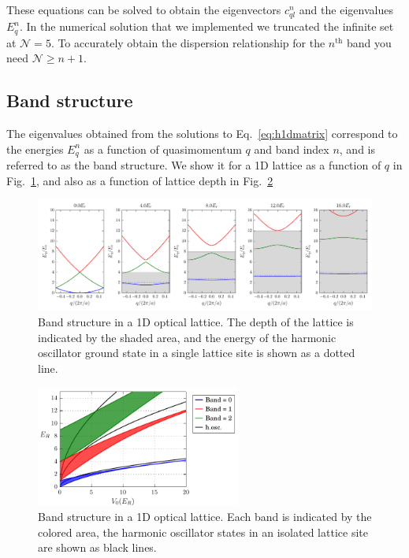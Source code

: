\documentclass[oneside,11pt]{memoir}
\begin{document}
These equations can be solved to obtain the eigenvectors $c_{ql}^{n}$ and the
eigenvalues $E_{q}^{n}$.  In the numerical solution that we implemented  we
truncated the infinite set at $\mathcal{N}=5$.  To accurately obtain the
dispersion relationship for the $n^{\text{th}}$ band you need $\mathcal{N}\geq
n+1$.  

\subsection{Band structure}

The eigenvalues  obtained from the solutions to Eq.~\ref{eq:h1dmatrix}
correspond to the energies $E_{q}^{n}$ as a function of quasimomentum $q$ and
band index $n$, and is referred to as the band structure.  We show it for a 1D
lattice as a function of $q$ in Fig.~\ref{fig:bands1d}, and also as a function
of lattice depth in Fig.~\ref{fig:bands1d_V0} 
\begin{figure}
\centering \includegraphics[width=\textwidth]{../figures/BandStructure_figures/bands1d.pdf}
\caption[Band structure in 1D lattice.]{\small Band structure in a 1D optical
lattice.  The depth of the lattice is indicated by the shaded area, and the
energy of the harmonic oscillator ground state in a single lattice site is shown
as a dotted line.  } \label{fig:bands1d}
\end{figure}
\begin{figure}
\centering \includegraphics[width=0.6\textwidth]{../figures/BandStructure_figures/bands1d_V0.pdf}
\caption[Band structure in 1D lattice.]{\small Band structure in a 1D optical
lattice.  Each band is indicated by the colored area,  the harmonic oscillator
states in an isolated lattice site are shown as black lines. }
\label{fig:bands1d_V0}
\end{figure}
\end{document}
